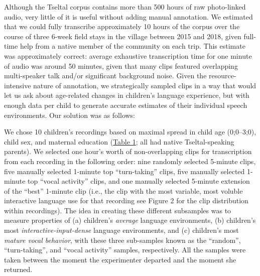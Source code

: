 \documentclass[,man,floatsintext]{apa6}
\begin{document}
Although the Tseltal corpus contains more than 500 hours of raw
photo-linked audio, very little of it is useful without adding manual
annotation. We estimated that we could fully transcribe approximately 10
hours of the corpus over the course of three 6-week field stays in the
village between 2015 and 2018, given full-time help from a native member
of the community on each trip. This estimate was approximately correct:
average exhaustive transcription time for one minute of audio was around
50 minutes, given that many clips featured overlapping multi-speaker
talk and/or significant background noise. Given the resource-intensive
nature of annotation, we strategically sampled clips in a way that would
let us ask about age-related changes in children's language experience,
but with enough data per child to generate accurate estimates of their
individual speech environments. Our solution was as follows:

We chose 10 children's recordings based on maximal spread in child age
(0;0--3;0), child sex, and maternal education
(\protect\hyperlink{tab1}{Table 1}; all had native Tseltal-speaking
parents). We selected one hour's worth of non-overlapping clips for
transcription from each recording in the following order: nine randomly
selected 5-minute clips, five manually selected 1-minute top
\enquote{turn-taking} clips, five manually selected 1-minute top
\enquote{vocal activity} clips, and one manually selected 5-minute
extension of the \enquote{best} 1-minute clip (i.e., the clip with the
most variable, most voluble interactive language use for that recording
see Figure 2 for the clip distribution within recordings). The idea in
creating these different subsamples was to measure properties of (a)
children's \emph{average} language environments, (b) children's most
\emph{interactive-input-dense} language environments, and (c) children's
most \emph{mature vocal behavior}, with these three sub-samples known as
the \enquote{random}, \enquote{turn-taking}, and \enquote{vocal
activity} samples, respectively. All the samples were taken between the
moment the experimenter departed and the moment she returned.
\end{document}
